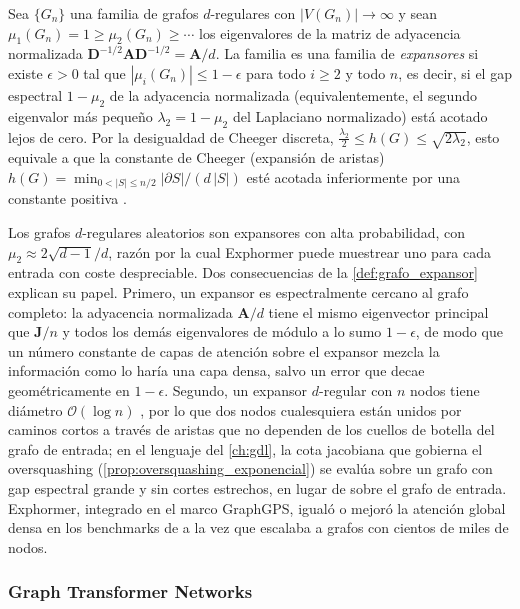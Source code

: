\begin{definition}\label{def:grafo_expansor}
Sea $\{G_n\}$ una familia de grafos $d$-regulares con $|V(G_n)| \to \infty$ y sean $\mu_1(G_n) = 1 \geq \mu_2(G_n) \geq \cdots$ los eigenvalores de la matriz de adyacencia normalizada $\mathbf{D}^{-1/2}\mathbf{A}\mathbf{D}^{-1/2} = \mathbf{A}/d$. La familia es una familia de \emph{expansores} si existe $\epsilon > 0$ tal que $|\mu_i(G_n)| \leq 1 - \epsilon$ para todo $i \geq 2$ y todo $n$, es decir, si el gap espectral $1 - \mu_2$ de la adyacencia normalizada (equivalentemente, el segundo eigenvalor más pequeño $\lambda_2 = 1 - \mu_2$ del Laplaciano normalizado) está acotado lejos de cero. Por la desigualdad de Cheeger discreta, $\tfrac{\lambda_2}{2} \leq h(G) \leq \sqrt{2\lambda_2}$, esto equivale a que la constante de Cheeger (expansión de aristas) $h(G) = \min_{0 < |S| \leq n/2} |\partial S| / (d\,|S|)$ esté acotada inferiormente por una constante positiva \citep{hoory2006expander}.
\end{definition}

Los grafos $d$-regulares aleatorios son expansores con alta probabilidad, con $\mu_2 \approx 2\sqrt{d-1}/d$, razón por la cual Exphormer puede muestrear uno para cada entrada con coste despreciable. Dos consecuencias de la \autoref{def:grafo_expansor} explican su papel. Primero, un expansor es espectralmente cercano al grafo completo: la adyacencia normalizada $\mathbf{A}/d$ tiene el mismo eigenvector principal que $\mathbf{J}/n$ y todos los demás eigenvalores de módulo a lo sumo $1 - \epsilon$, de modo que un número constante de capas de atención sobre el expansor mezcla la información como lo haría una capa densa, salvo un error que decae geométricamente en $1 - \epsilon$. Segundo, un expansor $d$-regular con $n$ nodos tiene diámetro $\mathcal{O}(\log n)$ \citep{hoory2006expander}, por lo que dos nodos cualesquiera están unidos por caminos cortos a través de aristas que no dependen de los cuellos de botella del grafo de entrada; en el lenguaje del \autoref{ch:gdl}, la cota jacobiana que gobierna el \gls{oversquashing} (\autoref{prop:oversquashing_exponencial}) se evalúa sobre un grafo con gap espectral grande y sin cortes estrechos, en lugar de sobre el grafo de entrada. Exphormer, integrado en el marco GraphGPS, igualó o mejoró la atención global densa en los benchmarks de \citet{rampasek2022graphgps} a la vez que escalaba a grafos con cientos de miles de nodos.

\subsubsection{Graph \gls{Transformer} Networks}\label{subsubsec:graph_transformers}

